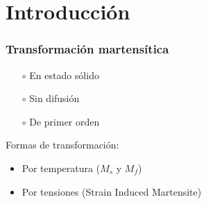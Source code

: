 \documentclass[usenames,dvipsnames]{beamer}
\begin{document}
\section{Introducción}
 \begin{frame}
 \frametitle{Transformación martensítica}

\begin{multicols}{2}
 
 \begin{itemize}
 \item[$\circ$] En estado sólido
  \item[$\circ$] Sin difusión
  \item[$\circ$] De primer orden
 \end{itemize}
 
 \hfill

 Formas de transformación:
  \begin{itemize}
  \item \alert<1>{Por temperatura ($M_s$ y $M_f$)}
  \item \alert<2>{Por tensiones (Strain Induced Martensite)}
 \end{itemize}


\end{multicols}
 
\end{frame}
\end{document}
